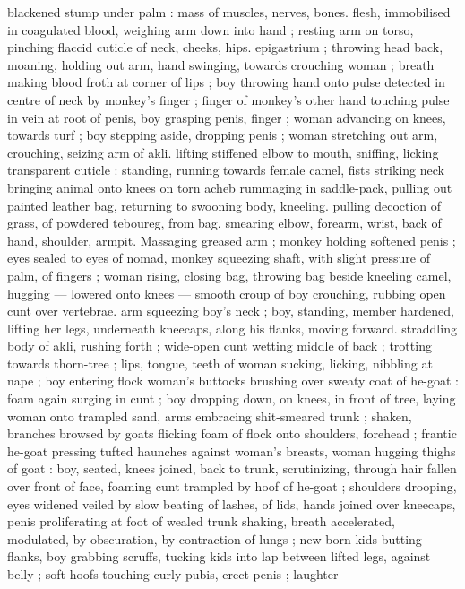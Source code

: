 blackened stump under palm : mass of muscles, nerves, bones. 
flesh, immobilised in coagulated blood, weighing arm down into hand 
; resting arm on torso, pinching flaccid cuticle of neck, cheeks, hips. 
epigastrium ; throwing head back, moaning, holding out arm, hand 
swinging, towards crouching woman ; breath making blood froth at 
corner of lips ; boy throwing hand onto pulse detected in centre of 
neck by monkey's finger ; finger of monkey's other hand touching 
pulse in vein at root of penis, boy grasping penis, finger ; woman 
advancing on knees, towards turf ; boy stepping aside, dropping 
penis ; woman stretching out arm, crouching, seizing arm of akli. 
lifting stiffened elbow to mouth, sniffing, licking transparent cuticle : 
standing, running towards female camel, fists striking neck bringing 
animal onto knees on torn acheb rummaging in saddle-pack, pulling 
out painted leather bag, returning to swooning body, kneeling. 
pulling decoction of grass, of powdered teboureg, from bag. 
smearing elbow, forearm, wrist, back of hand, shoulder, armpit. 
Massaging greased arm ; monkey holding softened penis ; eyes 
sealed to eyes of nomad, monkey squeezing shaft, with slight 
pressure of palm, of fingers ; woman rising, closing bag, throwing 
bag beside kneeling camel, hugging --- lowered onto knees --- 
smooth croup of boy crouching, rubbing open cunt over vertebrae. 
arm squeezing boy's neck ; boy, standing, member hardened, lifting 
her legs, underneath kneecaps, along his flanks, moving forward. 
straddling body of akli, rushing forth ; wide-open cunt wetting 
middle of back ; trotting towards thorn-tree ; lips, tongue, teeth of 
woman sucking, licking, nibbling at nape ; boy entering flock {\gl} 
woman's buttocks brushing over sweaty coat of he-goat : foam again 
surging in cunt ; boy dropping down, on knees, in front of tree, 
laying woman onto trampled sand, arms embracing shit-smeared 
trunk ; shaken, branches browsed by goats flicking foam of flock 
onto shoulders, forehead ; frantic he-goat pressing tufted haunches 
against woman's breasts, woman hugging thighs of goat : boy, 
seated, knees joined, back to trunk, scrutinizing, through hair fallen 
over front of face, foaming cunt trampled by hoof of he-goat ; 
shoulders drooping, eyes widened veiled by slow beating of lashes, 
of lids, hands joined over kneecaps, penis proliferating at foot of 
wealed trunk shaking, breath accelerated, modulated, by 
obscuration, by contraction of lungs ; new-born kids butting flanks, 
boy grabbing scruffs, tucking kids into lap between lifted legs, 
against belly ; soft hoofs touching curly pubis, erect penis ; laughter 
